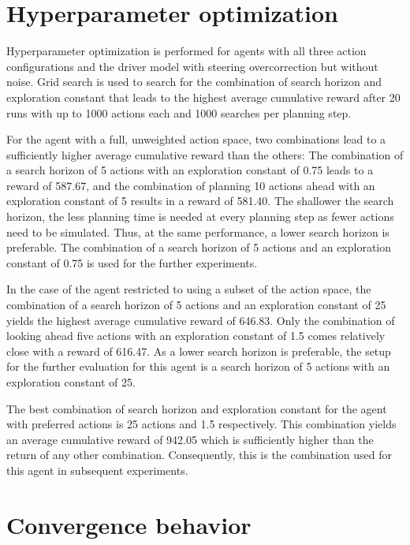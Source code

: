 \section{Hyperparameter optimization}

Hyperparameter optimization is performed for agents with all three action configurations and the driver model with steering overcorrection but without noise. Grid search is used to search for the combination of search horizon and exploration constant that leads to the highest average cumulative reward after 20 runs with up to 1000 actions each and 1000 searches per planning step.



For the agent with a full, unweighted action space, two combinations lead to a sufficiently higher average cumulative reward than the others: The combination of a search horizon of 5 actions with an exploration constant of 0.75 leads to a reward of 587.67, and the combination of planning 10 actions ahead with an exploration constant of 5 results in a reward of 581.40. The shallower the search horizon, the less planning time is needed at every planning step as fewer actions need to be simulated. Thus, at the same performance, a lower search horizon is preferable. The combination of a search horizon of 5 actions and an exploration constant of 0.75 is used for the further experiments.

In the case of the agent restricted to using a subset of the action space, the combination of a search horizon of 5 actions and an exploration constant of 25 yields the highest average cumulative reward of 646.83. Only the combination of looking ahead five actions with an exploration constant of 1.5 comes relatively close with a reward of 616.47. As a lower search horizon is preferable, the setup for the further evaluation for this agent is a search horizon of 5 actions with an exploration constant of 25. 

The best combination of search horizon and exploration constant for the agent with preferred actions is 25 actions and 1.5 respectively. This combination yields an average cumulative reward of 942.05 which is sufficiently higher than the return of any other combination. Consequently, this is the combination used for this agent in subsequent experiments.

\section{Convergence behavior}

